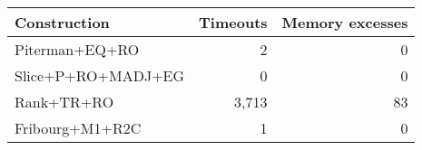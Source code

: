 \begin{tabular}{lrr}
  \hline
Construction & Timeouts & Memory excesses \\ 
  \hline
Piterman+EQ+RO & 2 & 0 \\ 
  Slice+P+RO+MADJ+EG & 0 & 0 \\ 
  Rank+TR+RO & 3,713 & 83 \\ 
  Fribourg+M1+R2C & 1 & 0 \\ 
   \hline
\end{tabular}
